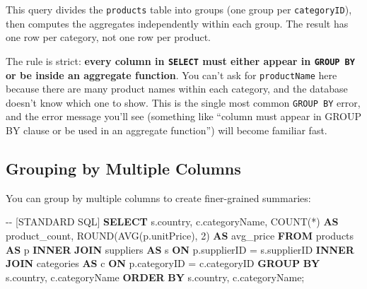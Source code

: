 \documentclass[
  letterpaper,
  DIV=11,
  numbers=noendperiod]{scrreprt}
\newenvironment{Shaded}{\begin{snugshade}}{\end{snugshade}}
\newcommand{\CommentTok}[1]{\textcolor[rgb]{0.37,0.37,0.37}{#1}}
\newcommand{\DecValTok}[1]{\textcolor[rgb]{0.68,0.00,0.00}{#1}}
\newcommand{\FunctionTok}[1]{\textcolor[rgb]{0.28,0.35,0.67}{#1}}
\newcommand{\KeywordTok}[1]{\textcolor[rgb]{0.00,0.23,0.31}{\textbf{#1}}}
\newcommand{\NormalTok}[1]{\textcolor[rgb]{0.00,0.23,0.31}{#1}}
\newcommand{\OperatorTok}[1]{\textcolor[rgb]{0.37,0.37,0.37}{#1}}
\begin{document}
This query divides the \texttt{products} table into groups (one group
per \texttt{categoryID}), then computes the aggregates independently
within each group. The result has one row per category, not one row per
product.

The rule is strict: \textbf{every column in \texttt{SELECT} must either
appear in \texttt{GROUP\ BY} or be inside an aggregate function}. You
can't ask for \texttt{productName} here because there are many product
names within each category, and the database doesn't know which one to
show. This is the single most common \texttt{GROUP\ BY} error, and the
error message you'll see (something like ``column must appear in GROUP
BY clause or be used in an aggregate function'') will become familiar
fast.

\subsection{Grouping by Multiple
Columns}\label{grouping-by-multiple-columns}

You can group by multiple columns to create finer-grained summaries:

\begin{codelisting}

\caption{\texttt{duckdb}}

\begin{Shaded}
\begin{Highlighting}[]
\CommentTok{{-}{-} [STANDARD SQL]}
\KeywordTok{SELECT}
\NormalTok{    s.country,}
\NormalTok{    c.categoryName,}
    \FunctionTok{COUNT}\NormalTok{(}\OperatorTok{*}\NormalTok{) }\KeywordTok{AS}\NormalTok{ product\_count,}
    \FunctionTok{ROUND}\NormalTok{(}\FunctionTok{AVG}\NormalTok{(p.unitPrice), }\DecValTok{2}\NormalTok{) }\KeywordTok{AS}\NormalTok{ avg\_price}
\KeywordTok{FROM}\NormalTok{ products }\KeywordTok{AS}\NormalTok{ p}
\KeywordTok{INNER} \KeywordTok{JOIN}\NormalTok{ suppliers }\KeywordTok{AS}\NormalTok{ s }\KeywordTok{ON}\NormalTok{ p.supplierID }\OperatorTok{=}\NormalTok{ s.supplierID}
\KeywordTok{INNER} \KeywordTok{JOIN}\NormalTok{ categories }\KeywordTok{AS}\NormalTok{ c }\KeywordTok{ON}\NormalTok{ p.categoryID }\OperatorTok{=}\NormalTok{ c.categoryID}
\KeywordTok{GROUP} \KeywordTok{BY}\NormalTok{ s.country, c.categoryName}
\KeywordTok{ORDER} \KeywordTok{BY}\NormalTok{ s.country, c.categoryName;}
\end{Highlighting}
\end{Shaded}

\end{codelisting}
\end{document}
